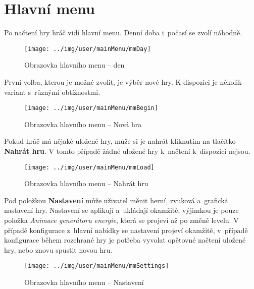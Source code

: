 
\section{Hlavní menu}

Po načtení hry hráč vidí hlavní menu. Denní doba i~počasí se zvolí náhodně.

\begin{figure}[!ht]\centering
\texttt{[image: ../img/user/mainMenu/mmDay]}

\caption{Obrazovka hlavního menu -- den}
\label{fig:user_mainMenu_mmDay}

\end{figure}


\FloatBarrier

První volba, kterou je možné zvolit, je výběr nové hry. K dispozici je několik variant s~různými obtížnostmi.

\begin{figure}[!ht]\centering
\texttt{[image: ../img/user/mainMenu/mmBegin]}

\caption{Obrazovka hlavního menu -- Nová hra}
\label{fig:user_mainMenu_mmBegin}

\end{figure}
\FloatBarrier

Pokud hráč má nějaké uložené hry, může si je nahrát kliknutím na tlačítko \textbf{Nahrát hru}. V tomto případě žádné uložené hry k~načtení k~dispozici nejsou.

\begin{figure}[!ht]\centering
\texttt{[image: ../img/user/mainMenu/mmLoad]}

\caption{Obrazovka hlavního menu -- Nahrát hru}
\label{fig:user_mainMenu_mmLoad}

\end{figure}
\FloatBarrier

Pod položkou \textbf{Nastavení} může uživatel měnit herní, zvuková a~grafická nastavení hry. Nastavení se aplikují a~ukládají okamžitě, výjimkou je pouze položka \textit{Animace generátoru energie}, která se projeví až po změně levelu. V případě konfigurace z~hlavní nabídky se nastavení projeví okamžitě, v~případě konfigurace během rozehrané hry je potřeba vyvolat opětovné načtení uložené hry, nebo znovu spustit novou hru.

\begin{figure}[!ht]\centering
\texttt{[image: ../img/user/mainMenu/mmSettings]}

\caption{Obrazovka hlavního menu -- Nastavení}
\label{fig:user_mainMenu_mmSettings}

\end{figure}

\FloatBarrier